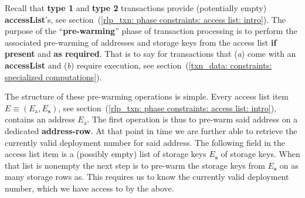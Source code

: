 Recall that \textbf{type 1} and \textbf{type 2} transactions provide (potentially empty) \textbf{accessList}'s, see section~(\ref{rlp_txn: phase constraints: access list: intro}).
The purpose of the ``\textbf{pre-warming}'' phase of transaction processing is to perform the associated pre-warming of addresses and storage keys from the access list \textbf{if present} and \textbf{as required}.
That is to say for transactions that
(\emph{a}) come with an \textbf{accessList} and
(\emph{b}) require \evm{} execution, see section~(\ref{txn_data: constraints: specialized computations}).

The structure of these pre-warming operations is simple.
Every access list item $E \equiv (E_\text{a}, E_\textbf{s})$, see section~(\ref{rlp_txn: phase constraints: access list: intro}), contains an address $E_\text{a}$.
The first operation is thus to pre-warm said address on a dedicated \textbf{address-row}.
At that point in time we are further able to retrieve the currently valid deployment number for said address.
The following field in the access list item is a (possibly empty) list of storage keys $E_\textbf{s}$ of storage keys.
When that list is nonempty the next step is to pre-warm the storage keys from $E_\textbf{s}$ on as many storage rows as.
This requires us to know the currently valid deployment number, which we have access to by the above.

